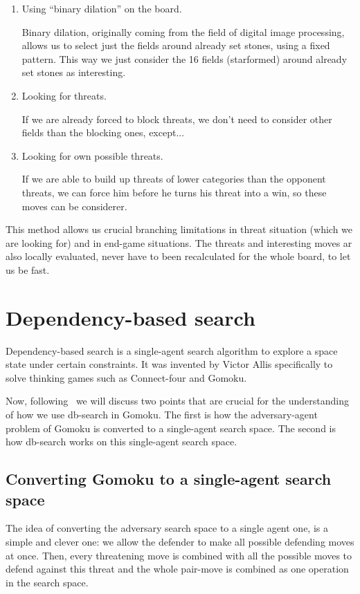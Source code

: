 \documentclass[10pt]{article}
\begin{document}
\begin{enumerate}
\item Using ``binary dilation'' on the board.

Binary dilation, originally coming from the field of digital image processing,
allows us to select just the fields around already set stones, using a fixed
pattern. This way we just consider the 16 fields (starformed) around already
set stones as interesting.

\item Looking for threats.

If we are already forced to block threats, we don't need to consider other
fields than the blocking ones, except...

\item Looking for own possible threats.

If we are able to build up threats of lower categories than the opponent
threats, we can force him before he turns his threat into a win, so these moves
can be considerer.
\end{enumerate}

This method allows us crucial branching limitations in threat situation (which
we are looking for) and in end-game situations. The threats and interesting
moves ar also locally evaluated, never have to been recalculated for the whole
board, to let us be fast.

\section{Dependency-based search}

Dependency-based search is a single-agent search algorithm to explore a space
state under certain constraints.  It was invented by Victor Allis specifically
to solve thinking games such as Connect-four and Gomoku.

Now, following~\cite{Allis92} we will discuss two points that are crucial for
the understanding of how we use db-search in Gomoku.  The first is how
the adversary-agent problem of Gomoku is converted to a single-agent search
space.  The second is how db-search works on this single-agent search space.

\subsection{Converting Gomoku to a single-agent search space}

The idea of converting the adversary search space to a single agent one, is a
simple and clever one: we allow the defender to make all possible defending
moves at once.  Then, every threatening move is combined with all the possible
moves to defend against this threat and the whole pair-move is combined as one
operation in the search space.
\end{document}
